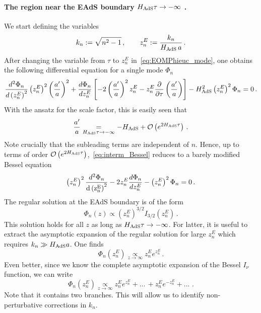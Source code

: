 \documentclass[a4paper,11pt]{article}
\begin{document}
\paragraph{The region near the EAdS boundary $H_{\rm AdS}\tau\to -\infty$ .}\label{par:AdSboundary}
We start defining the variables
\begin{equation}
    k_n := \sqrt{n^2-1}\,, \qquad z_n^{E} :=\frac{k_n}{H_{\rm AdS}\,a}\,.
\end{equation}
After changing the variable from $\tau$ to $z_n^{E}$ in~\eqref{eq:EOMPhieuc_mode}, one obtains the following differential equation for a single mode $\Phi_n$
\begin{equation}\label{eq:interm_Bessel}
    \frac{d^2\Phi_n}{d\left(z_n^{E}\right)^2} \left(z_n^{E}\right)^2 \left(\frac{a'}{a}\right)^2+\frac{d\Phi_n}{dz_n^{E}}\left[-2\left(\frac{a'}{a}\right)^2z_n^{E} - z_n^{E}\frac{\partial }{\partial \tau }\left( \frac{a'}{a}\right)\right]-H^2_{\rm AdS}\left(z_n^{E}\right)^2 \Phi_n =0\,.
\end{equation}
With the ansatz for the scale factor, this is easily seen that 
\begin{equation}
    \frac{a'}{a} \underset{H_{\rm AdS} \tau\to -\infty}{=} -H_{\rm AdS}+ \mathcal{O}\left(e^{2H_{\rm AdS}\tau}\right)\,.
\end{equation}
Note crucially that the subleading terms are independent of $n$. Hence, up to terms of order $\mathcal{O}\left(e^{2H_{\rm AdS}\tau}\right)$,~\eqref{eq:interm_Bessel} reduces to a barely modified Bessel equation
\begin{equation}
     \left(z_n^{E}\right)^2\frac{d^2\Phi_n}{\rm{d}\left(z_n^{E}\right)^2} -2z_n^{E}\frac{d\Phi_n}{dz_n^{E}}-\left(z_n^{E}\right)^2 \Phi_n =0\,.
\end{equation}
The regular solution at the EAdS boundary is of the form 
\begin{equation}
    \Phi_n(z) \propto \left(z_n^{E}\right)^{3/2}I_{3/2}(z_n^{E})\,.
\end{equation}
This solution holds for all $z$ as long as $H_{\rm AdS}\tau\to -\infty$. For latter, it is useful to extract the asymptotic expansion of the regular solution for large $z_n^{E}$ which requires $k_n\gg H_{\rm AdS}a$.  One finds
\begin{equation}\label{eq:largezBessel}
    \Phi_n(z_n^{E})\underset{z\to \infty}{\propto }z_n^{E} e^{z_n^{E}}\,.
\end{equation}
Even better, since we know the complete asymptotic expansion of the Bessel $I_{\nu}$ function, we can write
\begin{equation}\label{eq:asymptotic_expansion_nonperturb}
    \Phi_n(z_n^{E})\underset{z\to \infty}{\propto }z_n^{E} e^{z_n^{E}}+ ... \, + z_n^{E} e^{-z_n^{E}}+ ... \,\,.
\end{equation}
Note that it contains two branches. This will allow us to identify non-perturbative corrections in $k_n$.
\end{document}
